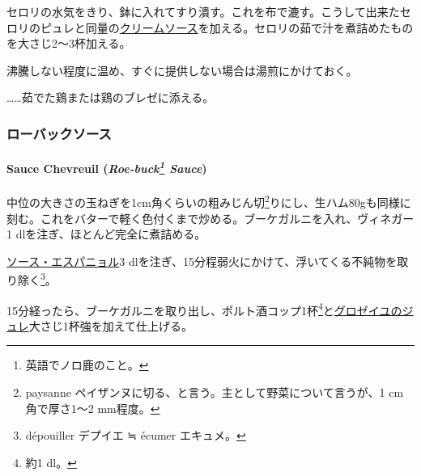 \begin{recette}
セロリの水気をきり、鉢に入れてすり潰す。これを布で漉す。こうして出来たセロリのピュレと同量の\protect\hyperlink{cream-sauce}{クリームソース}を加える。セロリの茹で汁を煮詰めたものを大さじ2〜3杯加える。

沸騰しない程度に温め、すぐに提供しない場合は湯煎にかけておく。

\ldots{}\ldots{}茹でた鶏または鶏のブレゼに添える。

\maeaki

\hypertarget{ux30edux30fcux30d0ux30c3ux30afux30bdux30fcux30b9}{%
\subsubsection{ローバックソース}\label{ux30edux30fcux30d0ux30c3ux30afux30bdux30fcux30b9}}

\hypertarget{roe-buck-sauce}{%
\paragraph[Sauce Chevreuil ()]{\texorpdfstring{Sauce Chevreuil
(\emph{Roe-buck\footnote{英語でノロ鹿のこと。}
Sauce})}{Sauce Chevreuil (Roe-buck Sauce)}}\label{roe-buck-sauce}}


中位の大きさの玉ねぎを1cm角くらいの粗みじん切\footnote{paysanne
  ペイザンヌに切る、と言う。主として野菜について言うが、1 cm角で厚さ1〜2
  mm程度。}りにし、生ハム80gも同様に刻む。これをバターで軽く色付くまで炒める。ブーケガルニを入れ、ヴィネガー1\undemi{}
dlを注ぎ、ほとんど完全に煮詰める。

\protect\hyperlink{sauce-espagnole}{ソース・エスパニョル}3
dlを注ぎ、15分程弱火にかけて、浮いてくる不純物を取り除く\footnote{dépouiller
  デプイエ ≒ écumer エキュメ。}。

15分経ったら、ブーケガルニを取り出し、ポルト酒コップ1杯\footnote{約1
  dl。}と\protect\hyperlink{}{グロゼイユのジュレ}大さじ1杯強を加えて仕上げる。


\end{recette}
